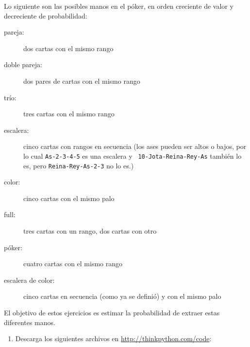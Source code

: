 \documentclass[10pt]{book}
\begin{document}
\begin{exercise}
\label{poker}

Lo siguiente son las posibles manos en el póker, en orden creciente
de valor y decreciente de probabilidad:

\begin{description}

\item[pareja:] dos cartas con el mismo rango
\vspace{-0.05in}

\item[doble pareja:] dos pares de cartas con el mismo rango
\vspace{-0.05in}

\item[trío:] tres cartas con el mismo rango
\vspace{-0.05in}

\item[escalera:] cinco cartas con rangos en secuencia (los ases pueden
ser altos o bajos, por lo cual {\tt As-2-3-4-5} es una escalera y {\tt
10-Jota-Reina-Rey-As} también lo es, pero {\tt Reina-Rey-As-2-3} no lo es.)
\vspace{-0.05in}

\item[color:] cinco cartas con el mismo palo
\vspace{-0.05in}

\item[full:] tres cartas con un rango, dos cartas con otro
\vspace{-0.05in}

\item[póker:] cuatro cartas con el mismo rango
\vspace{-0.05in}

\item[escalera de color:] cinco cartas en secuencia (como ya se definió) y
con el mismo palo
\vspace{-0.05in}

\end{description}
%
El objetivo de estos ejercicios es estimar
la probabilidad de extraer estas diferentes manos.

\begin{enumerate}

\item Descarga los siguientes archivos en \url{http://thinkpython.com/code}:

\begin{description}


\end{description}
\end{enumerate}
\end{exercise}
\end{document}

